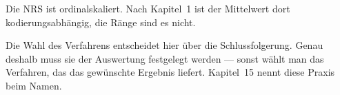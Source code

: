 \begin{aufgabe}
Die NRS ist ordinalskaliert. Nach Kapitel~1 ist der Mittelwert dort kodierungsabhängig, die Ränge sind es nicht.

\begin{center}
\begin{minipage}{0.88\textwidth}
\end{minipage}
\end{center}

Die Wahl des Verfahrens entscheidet hier über die Schlussfolgerung. Genau deshalb muss sie  der Auswertung festgelegt werden --- sonst wählt man das Verfahren, das das gewünschte Ergebnis liefert. Kapitel~15 nennt diese Praxis beim Namen.
\end{aufgabe}

